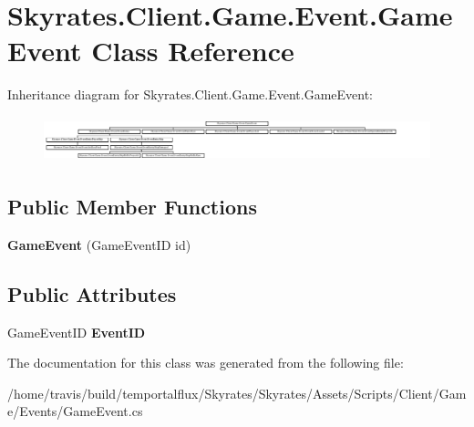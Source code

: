 \hypertarget{class_skyrates_1_1_client_1_1_game_1_1_event_1_1_game_event}{\section{Skyrates.\-Client.\-Game.\-Event.\-Game\-Event Class Reference}
\label{class_skyrates_1_1_client_1_1_game_1_1_event_1_1_game_event}
}
Inheritance diagram for Skyrates.\-Client.\-Game.\-Event.\-Game\-Event\-:\begin{figure}[H]
\begin{center}
\leavevmode
\includegraphics[height=1.325758cm]{class_skyrates_1_1_client_1_1_game_1_1_event_1_1_game_event}
\end{center}
\end{figure}
\subsection*{Public Member Functions}
\begin{DoxyCompactItemize}
\item 
\hypertarget{class_skyrates_1_1_client_1_1_game_1_1_event_1_1_game_event_a1ed88bc17b45282c7d2a4de8fc729a77}{{\bfseries Game\-Event} (Game\-Event\-I\-D id)}\label{class_skyrates_1_1_client_1_1_game_1_1_event_1_1_game_event_a1ed88bc17b45282c7d2a4de8fc729a77}

\end{DoxyCompactItemize}
\subsection*{Public Attributes}
\begin{DoxyCompactItemize}
\item 
\hypertarget{class_skyrates_1_1_client_1_1_game_1_1_event_1_1_game_event_a193001c33b9858618141589ca39723b3}{Game\-Event\-I\-D {\bfseries Event\-I\-D}}\label{class_skyrates_1_1_client_1_1_game_1_1_event_1_1_game_event_a193001c33b9858618141589ca39723b3}

\end{DoxyCompactItemize}


The documentation for this class was generated from the following file\-:\begin{DoxyCompactItemize}
\item 
/home/travis/build/temportalflux/\-Skyrates/\-Skyrates/\-Assets/\-Scripts/\-Client/\-Game/\-Events/Game\-Event.\-cs\end{DoxyCompactItemize}
